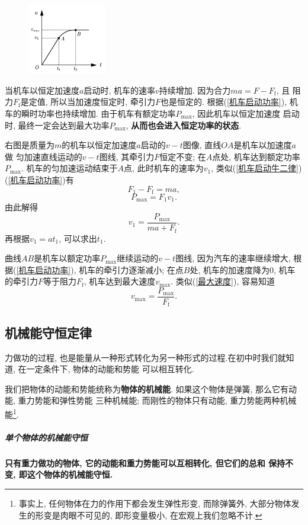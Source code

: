 \documentclass[11pt,a4paper]{ctexart}
\begin{document}
\begin{figure}
	\flushright
	\includegraphics[width=0.31\textwidth]{pic/pic11.pdf}
	\label{fic11}
\end{figure}

当机车以恒定加速度$a$启动时, 机车的速率$v$持续增加. 因为合力$ma = F - F_\mathrm{f}$, 且
阻力$F_\mathrm{f}$是定值, 所以当加速度恒定时, 牵引力$F$也是恒定的. 根据(\ref{机车启动功率}),
机车的瞬时功率也持续增加. 由于机车有额定功率$P_\mathrm{max}$, 因此机车以恒定加速度
启动时, 最终一定会达到最大功率$P_\mathrm{max}$, \textbf{从而也会进入恒定功率的状态}.

右图是质量为$m$的机车以恒定加速度$a$启动的$v-t$图像, 直线$OA$是机车以加速度$a$做
匀加速直线运动的$v-t$图线, 其牵引力$F$恒定不变; 在$A$点处, 机车达到额定功率$P_\mathrm{max}$.
机车的匀加速运动结束于$A$点, 此时机车的速率为$v_1$, 类似(\ref{机车启动牛二律})(\ref{机车启动功率})有
$$F_1 - F_\mathrm{f} = ma,$$ $$P_\mathrm{max} = F_1v_1.$$
由此解得$$v_1 = \frac{P_\mathrm{max}}{ma+F_\mathrm{f}}.$$
再根据$v_1 = at_1$, 可以求出$t_1$.

曲线$AB$是机车以额定功率$P_\mathrm{max}$继续运动的$v-t$图线, 因为汽车的速率继续增大, 根据(\ref{机车启动功率}),
机车的牵引力逐渐减小; 在点$B$处, 机车的加速度降为0, 机车的牵引力$F$等于阻力$F_\mathrm{f}$,
机车达到最大速度$v_\mathrm{max}$. 类似(\ref{最大速度}), 容易知道$$v_\mathrm{max} = \frac{P_\mathrm{max}}{F_\mathrm{f}}.$$

\subsection{机械能守恒定律}

力做功的过程, 也是能量从一种形式转化为另一种形式的过程.在初中时我们就知道, 在一定条件下, 物体的动能和势能
可以相互转化.

我们把物体的动能和势能统称为\textbf{物体的机械能}. 如果这个物体是弹簧, 那么它有动能, 重力势能和弹性势能
三种机械能; 而刚性的物体只有动能, 重力势能两种机械能\footnote{事实上, 任何物体在力的作用下都会发生弹性形变,
	而除弹簧外, 大部分物体发生的形变是肉眼不可见的, 即形变量极小, 在宏观上我们忽略不计.}.

\subparagraph{单个物体的机械能守恒} \textbf{只有重力做功的物体, 它的动能和重力势能可以互相转化, 但它们的总和
	保持不变, 即这个物体的机械能守恒.}
\end{document}
